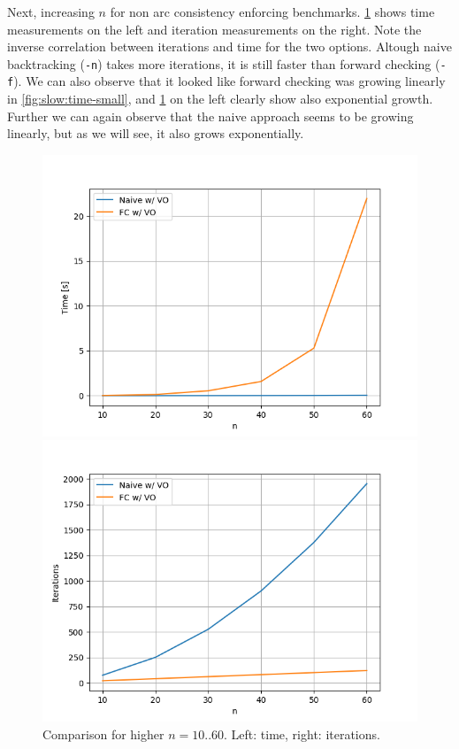 Next, increasing $n$ for non arc consistency enforcing benchmarks. \cref{fig:slow:sidebyside} shows time measurements on the left and iteration measurements on the right. Note the inverse correlation between iterations and time for the two options. Altough naive backtracking (\verb|-n|) takes more iterations, it is still faster than forward checking (\verb|-f|). We can also observe that it looked like forward checking was growing linearly in \cref{fig:slow:time-small}, and \cref{fig:slow:sidebyside} on the left clearly show also exponential growth. Further we can again observe that the naive approach seems to be growing linearly, but as we will see, it also grows exponentially.

\begin{figure}[ht]
	\centering
	\begin{minipage}{0.49\textwidth}
		\centering
		\includegraphics[width=\textwidth]{./Problems/slow_convergence/plots/time.png}
	\end{minipage}
	\hfill
	\begin{minipage}{0.49\textwidth}
		\centering
		\includegraphics[width=\textwidth]{./Problems/slow_convergence/plots/iterations.png}
	\end{minipage}
	\caption{Comparison for higher $n = 10..60$. Left: time, right: iterations.}
	\label{fig:slow:sidebyside}
\end{figure}

